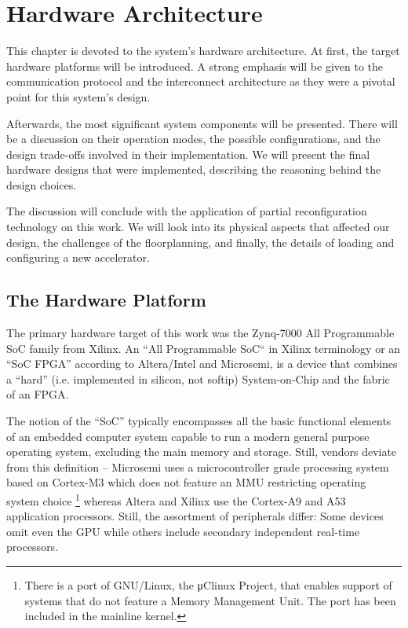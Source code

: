 \chapter{Hardware Architecture}

This chapter is devoted to the system's hardware architecture.
At first, the target hardware platforms will be introduced.
A strong emphasis will be given to the communication protocol and the interconnect architecture
as they were a pivotal point for this system's design.

Afterwards, the most significant system components will be presented.
There will be a discussion on their operation modes,
the possible configurations, and the design trade-offs involved in their implementation.
We will present the final hardware designs that were implemented,
describing the reasoning behind the design choices.

The discussion will conclude with the application of partial reconfiguration technology
on this work. We will look into its physical aspects that affected our design,
the challenges of the floorplanning, and finally, the details of loading and configuring
a new accelerator.

\section{The Hardware Platform}

The primary hardware target of this work was the Zynq-7000 All Programmable SoC family from Xilinx.
An ``All Programmable SoC`` in Xilinx terminology or an ``SoC FPGA'' according to Altera/Intel and Microsemi,
is a device that combines a ``hard'' (i.e. implemented in silicon, not \gls{softip}) System-on-Chip
and the \gls{fabric} of an FPGA.

The notion of the ``SoC'' typically encompasses all the basic functional elements of
an embedded computer system capable to run a modern general purpose operating system,
excluding the main memory and storage. Still, vendors deviate from this definition --
Microsemi uses a microcontroller grade processing system based on Cortex-M3
which does not feature an MMU restricting operating system choice
\footnote{There is a port of GNU/Linux, the μClinux Project, that enables support of systems
that do not feature a Memory Management Unit. The port has been included in the mainline kernel.}
whereas Altera and Xilinx use the Cortex-A9 and A53 application processors.
Still, the assortment of peripherals differ:
Some devices omit even the GPU while others include secondary independent real-time processors.

